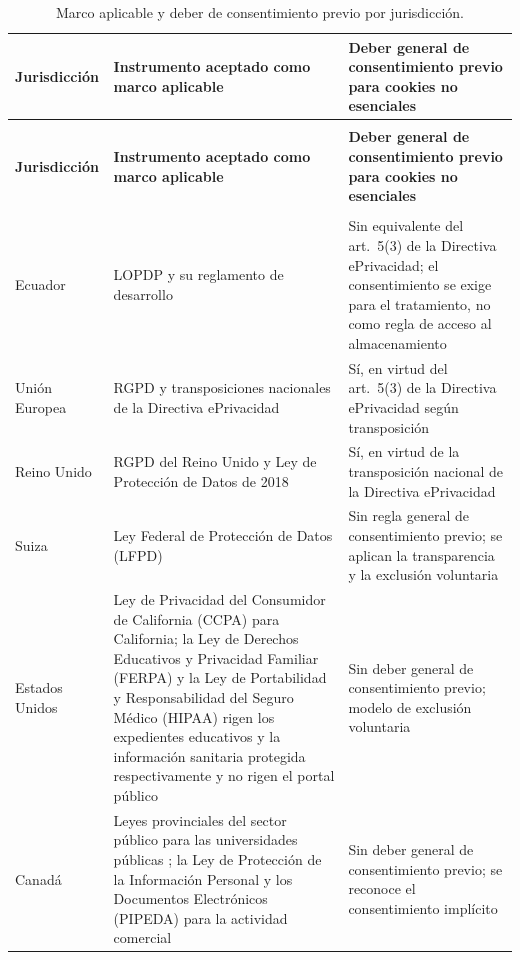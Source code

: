 \documentclass[pdflatex,sn-basic,Numbered,iicol]{sn-jnl}
\theoremstyle{thmstyleone}
\theoremstyle{thmstyletwo}
\theoremstyle{thmstylethree}
\begin{document}
\begin{appendices}
\footnotesize
\begin{longtable}{@{}>{\RaggedRight}p{2.4cm}>{\RaggedRight}p{5.5cm}>{\RaggedRight\arraybackslash}p{4.1cm}@{}}
	\caption{Marco aplicable y deber de consentimiento previo por jurisdicci\'on.}\label{tab:mapeo}\\
	\toprule
	\textbf{Jurisdicci\'on} & \textbf{Instrumento aceptado como marco aplicable} & \textbf{Deber general de consentimiento previo para cookies no esenciales} \\
	\midrule
	\endfirsthead
	\multicolumn{3}{c}{\textit{(Tabla~\ref{tab:mapeo}, continuaci\'on)}}\\
	\toprule
	\textbf{Jurisdicci\'on} & \textbf{Instrumento aceptado como marco aplicable} & \textbf{Deber general de consentimiento previo para cookies no esenciales} \\
	\midrule
	\endhead
	\midrule
	\multicolumn{3}{r}{\textit{Contin\'ua en la p\'agina siguiente}}\\
	\endfoot
	\bottomrule
	\endlastfoot
	Ecuador & LOPDP y su reglamento de desarrollo \citep{lopdp2021,reglamentolopdp2023} & Sin equivalente del art.\ 5(3) de la Directiva ePrivacidad; el consentimiento se exige para el tratamiento, no como regla de acceso al almacenamiento \\
	\addlinespace
	Uni\'on Europea & RGPD \citep{gdpr2016} y transposiciones nacionales de la Directiva ePrivacidad \citep{eprivacy2002} & S\'i, en virtud del art.\ 5(3) de la Directiva ePrivacidad seg\'un transposici\'on \citep{edpb2024eprivacy} \\
	\addlinespace
	Reino Unido & RGPD del Reino Unido y Ley de Protecci\'on de Datos de 2018 \citep{ukdpa2018} & S\'i, en virtud de la transposici\'on nacional de la Directiva ePrivacidad \\
	\addlinespace
	Suiza & Ley Federal de Protecci\'on de Datos (LFPD) \citep{fadp_ch} & Sin regla general de consentimiento previo; se aplican la transparencia y la exclusi\'on voluntaria \\
	\addlinespace
	Estados Unidos & Ley de Privacidad del Consumidor de California (CCPA) \citep{ccpa2018} para California; la Ley de Derechos Educativos y Privacidad Familiar (FERPA) \citep{ferpa1974} y la Ley de Portabilidad y Responsabilidad del Seguro M\'edico (HIPAA) \citep{hipaa1996} rigen los expedientes educativos y la informaci\'on sanitaria protegida respectivamente y no rigen el portal p\'ublico & Sin deber general de consentimiento previo; modelo de exclusi\'on voluntaria \\
	\addlinespace
	Canad\'a & Leyes provinciales del sector p\'ublico para las universidades p\'ublicas \citep{fippa_on,fippa_bc,quebec_privacy}; la Ley de Protecci\'on de la Informaci\'on Personal y los Documentos Electr\'onicos (PIPEDA) \citep{pipeda2000} para la actividad comercial & Sin deber general de consentimiento previo; se reconoce el consentimiento impl\'icito \\

\end{longtable}
\end{appendices}
\end{document}
